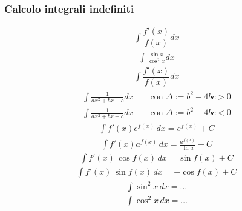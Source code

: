 \documentclass[letterpaper,10pt,italian]{jupyterBook}
\begin{document}
\subsubsection{Calcolo integrali indefiniti}
\label{\detokenize{ch/infinitesimal_calculus/integrals-problems:calcolo-integrali-indefiniti}}\begin{equation*}
\begin{split}\int \dfrac{f'(x)}{f(x)} dx\end{split}
\end{equation*}\begin{equation*}
\begin{split}\int \frac{\sin x}{\cos^2 x} dx\end{split}
\end{equation*}\begin{equation*}
\begin{split}\int \dfrac{f'(x)}{f(x)} dx\end{split}
\end{equation*}\begin{equation*}
\begin{split}\int \frac{1}{a x^2 + b x + c} dx \qquad \text{con } \Delta := b^2 - 4 bc > 0\end{split}
\end{equation*}\begin{equation*}
\begin{split}\int \frac{1}{a x^2 + b x + c} dx \qquad \text{con } \Delta := b^2 - 4 bc < 0\end{split}
\end{equation*}\begin{equation*}
\begin{split}\int f'(x) e^{f(x)} \, dx  = e^{f(x)} + C\end{split}
\end{equation*}\begin{equation*}
\begin{split}\int f'(x) a^{f(x)} \, dx  = \frac{a^{f(x)}}{\ln a} + C\end{split}
\end{equation*}\begin{equation*}
\begin{split}\int f'(x) \, \cos f(x) \, dx = \sin f(x) + C\end{split}
\end{equation*}\begin{equation*}
\begin{split}\int f'(x) \, \sin f(x) \, dx =-\cos f(x) + C\end{split}
\end{equation*}\begin{equation*}
\begin{split}\int \sin^2 x \, dx = \dots\end{split}
\end{equation*}\begin{equation*}
\begin{split}\int \cos^2 x \, dx = \dots\end{split}
\end{equation*}
\sphinxstepscope
\end{document}
